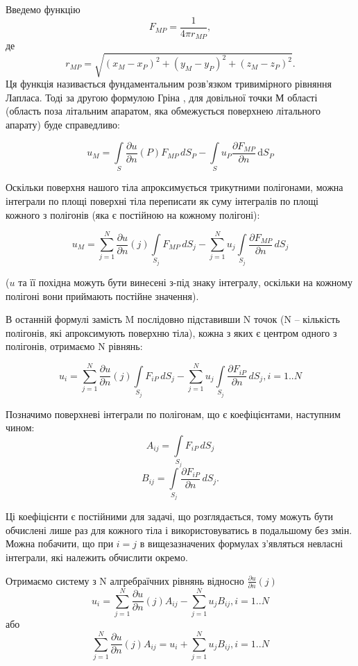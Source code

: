 \documentclass[a4paper,12pt]{article}
\begin{document}
Введемо функцію \[F_{MP} = \frac{1}{4\pi r_{MP}},\] де \[r_{MP} = \sqrt{(x_M - x_P)^2 + (y_M - y_P)^2 + (z_M - z_P)^2}.\]
Ця функція називається фундаментальним розв’язком тривимірного рівняння Лапласа. Тоді за другою формулою Гріна \cite{ilina}, для довільної точки М області (область поза літальним апаратом, яка обмежується поверхнею літального апарату) буде справедливо:

\[
u_M = \int\limits_S \frac{\partial u}{\partial n}(P) F_{MP} \, d S_P - \int\limits_S u_P \frac{\partial F_{MP}}{\partial n} \, \mathrm{d}S_P
\]

Оскільки поверхня нашого тіла апроксимується трикутними полігонами, можна інтеграли по площі поверхні тіла переписати як суму інтегралів по площі кожного з полігонів (яка є постійною на кожному полігоні):

\begin{equation} \label{eq:triangulated_equation}
u_M = \sum_{j=1}^{N} \frac{\partial u}{\partial n}(j) \int\limits_{S_j} F_{MP} \, dS_j - \sum_{j=1}^{N} u_j \int\limits_{S_j} \frac{\partial F_{MP}}{\partial n} \, dS_j
\end{equation}

($u$ та її похідна можуть бути винесені з-під знаку інтегралу, оскільки на кожному полігоні вони приймають постійне значення).

В останній формулі замість M послідовно підставивши N точок (N -- кількість полігонів, які апроксимують поверхню тіла), кожна з яких є центром одного з полігонів, отримаємо N рівнянь:

\[
u_i = \sum_{j=1}^{N} \frac{\partial u}{\partial n}(j) \int\limits_{S_j} F_{iP} \, dS_j - \sum_{j=1}^{N} u_j \int\limits_{S_j} \frac{\partial F_{iP}}{\partial n} \, dS_j, i = 1..N
\]

Позначимо поверхневі інтеграли по полігонам, що є коефіцієнтами, наступним чином:
\[A_{ij} = \int\limits_{S_j} F_{iP} \, dS_j\]
\[B_{ij} = \int\limits_{S_j} \frac{\partial F_{iP}}{\partial n} \, dS_j.\]

Ці коефіцієнти є постійними для задачі, що розглядається, тому можуть бути обчислені лише раз для кожного тіла і використовуватись в подальшому без змін. Можна побачити, що при $i = j$ в вищезазначених формулах з’являться невласні інтеграли, які належить обчислити окремо.

Отримаємо систему з N алгребраїчних рівнянь відносно $\frac{\partial u}{\partial n}(j)$
\[
u_i = \sum_{j=1}^{N} \frac{\partial u}{\partial n}(j) A_{ij} - \sum_{j=1}^{N} u_j B_{ij}, i = 1..N
\]
або
\[
\sum_{j=1}^{N} \frac{\partial u}{\partial n}(j) A_{ij} = u_i + \sum_{j=1}^{N} u_j B_{ij}, i = 1..N
\]
\end{document}
